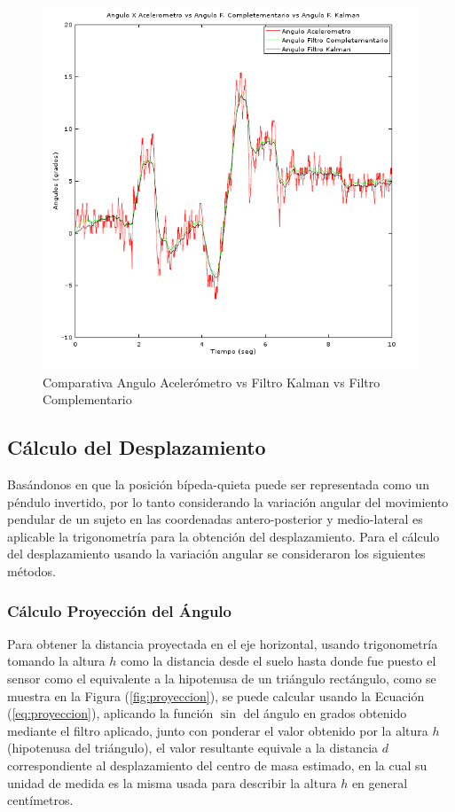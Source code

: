 \documentclass[12pt,a4paper]{article}
\begin{document}
\begin{figure}[H]
	\centering
	\includegraphics[scale=0.7]{images/angKalCom}
	\caption{Comparativa Angulo Acelerómetro vs Filtro Kalman vs Filtro Complementario}
	\label{fig:AnguloXvsFiltros}
\end{figure}

\subsection{Cálculo del Desplazamiento}
Basándonos en que la posición bípeda-quieta puede ser representada como un péndulo invertido, por lo tanto considerando la variación angular del movimiento pendular de un sujeto en las coordenadas antero-posterior y medio-lateral es aplicable la trigonometría para la obtención del desplazamiento.
Para el cálculo del desplazamiento usando la variación angular se consideraron los siguientes métodos. 

\subsubsection{Cálculo Proyección del Ángulo}
Para obtener la distancia proyectada en el eje horizontal, usando trigonometría tomando la altura $h$ como la distancia desde el suelo hasta donde fue puesto el sensor como el equivalente a la hipotenusa de un triángulo rectángulo, como se muestra en la Figura (\ref{fig:proyeccion}), se puede calcular usando la Ecuación (\ref{eq:proyeccion}), aplicando la función $\sin$ del ángulo en grados obtenido mediante el filtro aplicado, junto con ponderar el valor obtenido por la altura $h$ (hipotenusa del triángulo), el valor resultante equivale a la distancia $d$ correspondiente al desplazamiento del centro de masa estimado, en la cual su unidad de medida es la misma usada para describir la altura $h$ en general centímetros.
\end{document}
